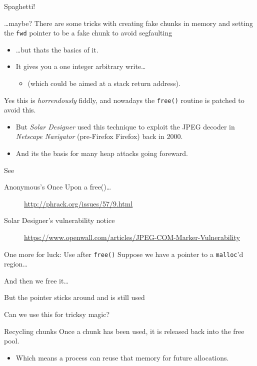 \documentclass[9pt,aspectratio=169]{beamer}
\begin{document}
\begin{frame}[label={sec:org59d98d6},fragile]{Spaghetti!}
 \begin{block}{\ldots{}maybe?}
There are some tricks with creating fake chunks in memory and setting the \texttt{fwd} pointer to be a fake chunk to avoid segfaulting
\begin{itemize}
\item \ldots{}but thats the basics of it.
\item It gives you a one integer arbitrary write\ldots{}
\begin{itemize}
\item (which could be aimed at a stack return address).
\end{itemize}
\end{itemize}

Yes this is \emph{horrendously} fiddly, and nowadays the \texttt{free()} routine is patched to avoid this.
\begin{itemize}
\item But \emph{Solar Designer} used this technique to exploit the JPEG decoder in \emph{Netscape Navigator} (pre-Firefox Firefox) back in 2000.
\item And its the basis for many heap attacks going foreward.
\end{itemize}

See
\begin{description}
\item[{Anonymous's Once Upon a free()\ldots{}}] \url{http://phrack.org/issues/57/9.html}
\item[{Solar Designer's vulnerability notice}] \url{https://www.openwall.com/articles/JPEG-COM-Marker-Vulnerability}
\end{description}
\end{block}
\end{frame}
\begin{frame}[label={sec:orgb47ce97},fragile]{One more for luck: Use after \texttt{free()}}
 Suppose we have a pointer to a \texttt{malloc}'d region\ldots{}

And then we free it\ldots{}

But the pointer sticks around and is still used
\begin{block}{Can we use this for tricksy magic?}
\end{block}
\end{frame}
\begin{frame}[label={sec:org67ca7e7}]{Recycling chunks}
Once a chunk has been used, it is released back into the free pool.
\begin{itemize}
\item Which means a process can reuse that memory for future allocations.
\end{itemize}
\end{frame}
\end{document}

